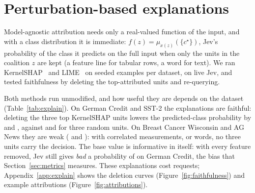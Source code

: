\section{Perturbation-based explanations}
\label{sec:explain}

Model-agnostic attribution needs only a real-valued function of the input, and with a class
distribution it is immediate: $f(z) = \mu_{x(z)}(\{c^\star\})$, Jev's probability of the class it
predicts on the full input when only the units in the coalition $z$ are kept (a feature line for
tabular rows, a word for text). We ran KernelSHAP~\citep{lundberg2017shap} and
LIME~\citep{ribeiro2016lime} on \ExExamplesGerman{} seeded examples per dataset, on live Jev, and
tested faithfulness by deleting the top-attributed units and re-querying.

\begin{table}[t]
  \caption{Explanations of Jev's predictions: mean drop in the predicted-class probability and
    share of label flips after deleting the top three attributed units, against three random
    units; Kendall's $\tau$ and top-3 overlap between KernelSHAP and LIME; and Jev requests used.}
  \label{tab:explain}
  \centering\small
  \setlength{\tabcolsep}{4pt}
  \fittable{}
\end{table}

Both methods run unmodified, and how useful they are depends on the dataset
(Table~\ref{tab:explain}). On German Credit
and SST-2 the explanations are faithful: deleting the three top KernelSHAP units lowers the
predicted-class probability by \ExDropShapGermanKThree{} and \ExDropShapSstKThree, against
\ExDropRandomGermanKThree{} and \ExDropRandomSstKThree{} for three random units. On Breast Cancer
Wisconsin and AG News they are weak (\ExDropShapWdbcKThree{} and \ExDropShapAgnewsKThree): with
\ExMeanUnitsWdbc{} correlated measurements, or \ExMeanUnitsAgnews{} words, no three units carry
the decision. The base value is informative in itself: with every feature removed, Jev still
gives \emph{bad} a probability of \ExEmptyInputPositiveGerman{} on German Credit, the bias that
Section~\ref{sec:metrics} measures. These explanations cost \ExRequestsTotal{} requests;
Appendix~\ref{app:explain} shows the deletion curves (Figure~\ref{fig:faithfulness}) and
example attributions (Figure~\ref{fig:attributions}).
